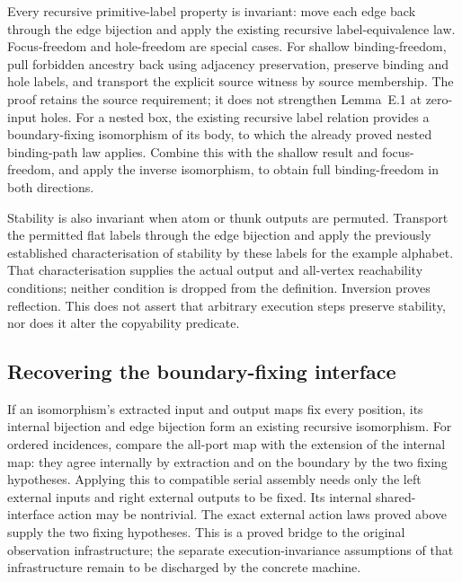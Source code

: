 Every recursive primitive-label property is invariant: move each edge
back through the edge bijection and apply the existing recursive label-equivalence
law. Focus-freedom and hole-freedom are special cases. For shallow binding-freedom,
pull forbidden ancestry back using adjacency preservation, preserve binding and
hole labels, and transport the explicit source witness by source membership.
The proof retains the source requirement; it does not strengthen Lemma~E.1 at
zero-input holes. For a nested box, the existing recursive label relation provides
a boundary-fixing isomorphism of its body, to which the already proved nested
binding-path law applies. Combine this with the shallow result and focus-freedom,
and apply the inverse isomorphism, to obtain full binding-freedom in both directions.


Stability is also invariant when atom or thunk outputs are permuted.
Transport the permitted flat labels through the edge bijection and apply the
previously established characterisation of stability by these labels for the
example alphabet. That characterisation supplies the actual output and
all-vertex reachability conditions; neither condition is dropped from the
definition. Inversion proves reflection. This does not assert that arbitrary
execution steps preserve stability, nor does it alter the copyability predicate.


\subsection{Recovering the boundary-fixing interface}
If an isomorphism's extracted input and output maps fix every position, its
internal bijection and edge bijection form an existing recursive isomorphism.
For ordered incidences, compare the all-port map with the extension of the
internal map: they agree internally by extraction and on the boundary by the
two fixing hypotheses. Applying this to compatible serial assembly needs only
the left external inputs and right external outputs to be fixed. Its internal
shared-interface action may be nontrivial. The exact external action laws proved
above supply the two fixing hypotheses. This is a proved bridge to the original
observation infrastructure; the separate execution-invariance assumptions of
that infrastructure remain to be discharged by the concrete machine.

